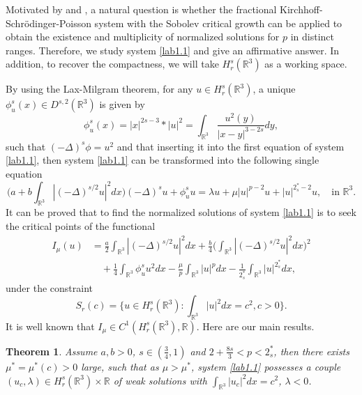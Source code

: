\documentclass[11pt]{article}
\numberwithin{equation}{section}
\newtheorem{theorem}{Theorem}[section]
\begin{document}
Motivated by \cite{H2588} and \cite{wang1388}, a natural question is whether the
fractional Kirchhoff-Schr\"odinger-Poisson system with the Sobolev critical growth can
be applied to obtain the  existence and multiplicity   of normalized solutions for $p$
in distinct ranges.
Therefore, we study system \eqref{lab1.1} and give an affirmative answer.
In addition, to recover the compactness, we will take $H^s_r(\mathbb{R}^3)$ as a
working space.

By using the Lax-Milgram theorem, for any $u\in H^s_r(\mathbb{R}^3)$, a unique
$\phi ^s_u(x)\in D^{s,2}(\mathbb{R}^3)$ is given by
\[ \label{lab1.4}
\phi ^s_u(x)=|x|^{2s-3}\ast|u|^2=\int_{\mathbb{R}^3}\frac{u^2(y)}{|x-y|^{3-2s}}dy,
\]
such that $(-\Delta)^s\phi =u^2$ and that inserting it into the first equation of
system \eqref{lab1.1}, then system \eqref{lab1.1} can be transformed into the following
single equation
\begin{equation}\label{lab1.5}
\Big(a+b\int_{\mathbb{R}^3}|(-\Delta)^{s/2}u|^2dx\Big)(-\Delta)^s u
 + \phi^s_u u= \lambda u+ \mu|u|^{p-2}u+ |u|^{2^*_s-2}u, \quad\text{in }\mathbb{R}^3.
\end{equation}
It can be proved  that to find the normalized solutions of system \eqref{lab1.1}
is to seek the critical points of the functional
\begin{align*}
  I_\mu(u)
&=\frac{a}{2}\int_{\mathbb{R}^3}|(-\Delta)^{s/2}u|^2dx
  +\frac{b}{4}\Big(\int_{\mathbb{R}^3}|(-\Delta)^{s/2}u|^2dx\Big)^2\\
&\quad +\frac{1}{4}\int_{\mathbb{R}^3}\phi ^s_uu^2dx
 -\frac{\mu}{p}\int _{\mathbb{R}^3}|u|^pdx
 -\frac{1}{2^*_s}\int _{\mathbb{R}^3}|u|^{2^*_s}dx,
\end{align*}
under the constraint
\[ \label{1.8}
S_r(c)=\Big\{u \in H^s_r(\mathbb{R}^3):\int_{\mathbb{R}^3}|u|^2dx=c^2,c>0\Big\}.
\]
It is well known that $I_\mu\in {C}^1(H^s_r(\mathbb{R}^3), \mathbb{R})$.
Here are our main results.
\setcounter{theorem}{1}
\begin{theorem}\label{thm1.2}
Assume $a,b>0$, $s\in(\frac{3}{4},1)$ and $2+\frac{8s}{3}<p<2^*_s$, then there exists
$\mu^*=\mu^*(c)>0$ large, such that as $\mu>\mu^*$, system \eqref{lab1.1}
possesses a couple $(u_c, \lambda)\in H^s_r(\mathbb{R}^3)\times \mathbb{R}$ of weak
solutions with $\int_{\mathbb{R}^3}|u_c|^2dx=c^2$, $\lambda<0$.
\end{theorem}
\end{document}
